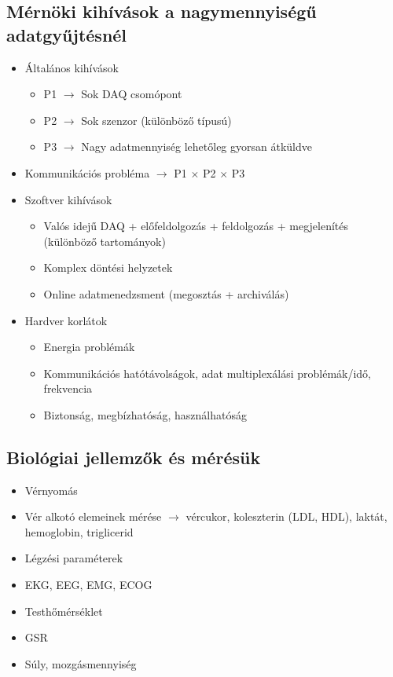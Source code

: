 \subsection{Mérnöki kihívások a nagymennyiségű adatgyűjtésnél}
\begin{itemize}
    \item Általános kihívások
    \begin{itemize}
        \item P1 $\rightarrow$ Sok DAQ csomópont
        \item P2 $\rightarrow$ Sok szenzor (különböző típusú)
        \item P3 $\rightarrow$ Nagy adatmennyiség lehetőleg gyorsan átküldve
    \end{itemize}
    \item Kommunikációs probléma $\rightarrow$ P1 $\times$ P2 $\times$ P3
    \item Szoftver kihívások
    \begin{itemize}
        \item Valós idejű DAQ + előfeldolgozás + feldolgozás + megjelenítés (különböző tartományok)
        \item Komplex döntési helyzetek
        \item Online adatmenedzsment (megosztás + archiválás)
    \end{itemize}
    \item Hardver korlátok
    \begin{itemize}
        \item Energia problémák
        \item Kommunikációs hatótávolságok, adat multiplexálási problémák/idő, frekvencia
        \item Biztonság, megbízhatóság, használhatóság
    \end{itemize}
\end{itemize}

\subsection{Biológiai jellemzők és mérésük}
\begin{itemize}
    \item Vérnyomás
    \item Vér alkotó elemeinek mérése $\rightarrow$ vércukor, koleszterin (LDL, HDL), laktát, hemoglobin, triglicerid
    \item Légzési paraméterek
    \item EKG, EEG, EMG, ECOG
    \item Testhőmérséklet
    \item GSR
    \item Súly, mozgásmennyiség
\end{itemize}

